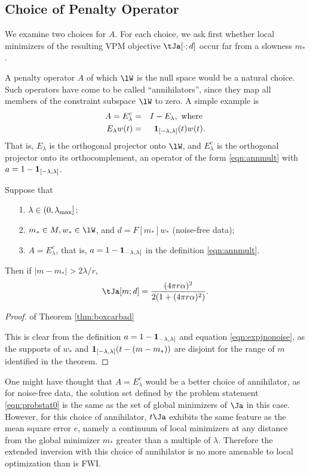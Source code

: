 \subsection{Choice of Penalty Operator}

We examine two choices for $A$. For each choice, we ask first whether local minimizers 
of the resulting VPM objective $\tJa[\cdot;d]$ occur far from a slowness $m_*$. 

A penalty operator $A$ of which $\lW$ is the null space would be a
natural choice. Such operators have come to be called
``annihilators'', since they map all members of the constraint
subspace $\lW$ to zero.  A simple example is
\begin{eqnarray}
  A = E^c_{\lambda}&=&I - E_{\lambda},\mbox{ where } \nonumber \\
  E_{\lambda}w(t) &=&{\bf 1}_{[-\lambda,\lambda]}(t)w(t). 
                      \label{eqn:ann0}
\end{eqnarray}
That is, $E_{\lambda}$ is the orthogonal projector onto $\lW$,
and $E_{\lambda}^c$ is the orthogonal projector onto its
orthocomplement, an operator of the form \ref{eqn:annmult} with $a
= 1 - {\bf 1}_{[-\lambda,\lambda]}$. %

\begin{theorem}
  \label{thm:boxcarbad}
  Suppose that
  \begin{itemize}
  \item[1. ] $\lambda \in (0,\lambda_{\rm max}]$;
  \item[2. ] $m_*\in M, w_*\in \lW$, and $d=F[m_*]w_*$ (noise-free
    data);
  \item[3. ] $A=E^c_{\lambda}$, that is, $a=1-{\bf 1}_{-\lambda,\lambda]}$ in
    the definition \ref{eqn:annmult}.
  \end{itemize}
  Then if $|m-m_*| >  2\lambda/r$,
  \[
    \tJa[m;d] = \frac{(4\pi r \alpha)^2}{2(1+(4 \pi r \alpha)^2)}.
  \]
\end{theorem}

\begin{proof} of Theorem \ref{thm:boxcarbad}
  
 This is clear from the definition $a = 1-{\bf 1}_{-\lambda,\lambda]}$ and equation \ref{eqn:expjnonoise}, as the supports of $w_*$ and ${\bf
    1}_{[-\lambda,\lambda]}(t-(m-m_*))$ are disjoint for the range of
  $m$ identified in the theorem.
\end{proof}

One might have thought that $A=E^c_{\lambda}$ would be a better choice
of annihilator, as for noise-free
data, the solution set defined by the problem statement
\ref{eqn:probstat0} is the same as the set of global minimizers of
$\Ja$ in this case. However, for this choice of annihilator,
$t\Ja$ exhibits the same feature as the mean square error $e$, namely
a continuum of local minimizers at any distance from the global
minimizer $m_*$ greater than a multiple of $\lambda$. Therefore the
extended inversion with this choice of annihilator is no more amenable
to local optimization than is FWI.

